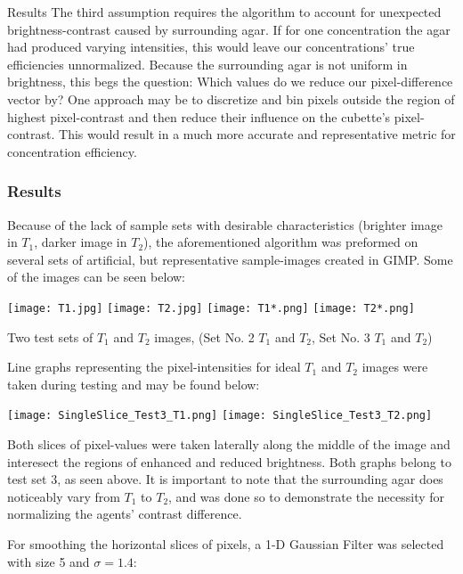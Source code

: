\documentclass[a4paper,12pt]{article}
\begin{document}
\begin{section}{Results}
The third assumption requires the algorithm to account for unexpected brightness-contrast caused by surrounding agar. If for one concentration the agar had produced varying intensities, this would leave our concentrations' true efficiencies unnormalized. Because the surrounding agar is not uniform in brightness, this begs the question: Which values do we reduce our pixel-difference vector by? One approach may be to discretize and bin pixels outside the region of highest pixel-contrast and then reduce their influence on the cubette's pixel-contrast. This would result in a much more accurate and representative metric for concentration efficiency. 

\subsubsection{Results}

Because of the lack of sample sets with desirable characteristics (brighter image in $T_1$, darker image in $T_2$), the aforementioned algorithm was preformed on several sets of artificial, but representative sample-images created in GIMP. Some of the images can be seen below:

\begin{center}
\texttt{[image: T1.jpg]}
\texttt{[image: T2.jpg]}
\texttt{[image: T1*.png]}
\texttt{[image: T2*.png]}
\end{center}
\begin{center}
\small{Two test sets of $T_1$ and $T_2$ images, (Set No. 2 $T_1$ and $T_2$, Set No. 3 $T_1$ and $T_2$)}
\end{center}

Line graphs representing the pixel-intensities for ideal $T_1$ and $T_2$ images were taken during testing and may be found below:

\begin{center}
\texttt{[image: SingleSlice\_Test3\_T1.png]}
\texttt{[image: SingleSlice\_Test3\_T2.png]}
\end{center}

Both slices of pixel-values were taken laterally along the middle of the image and interesect the regions of enhanced and reduced brightness. Both graphs belong to test set 3, as seen above. It is important to note that the surrounding agar does noticeably vary from $T_1$ to $T_2$, and was done so to demonstrate the necessity for normalizing the agents' contrast difference.

For smoothing the horizontal slices of pixels, a 1-D Gaussian Filter was selected with size 5 and $\sigma = 1.4$:


\end{section}
\end{document}
